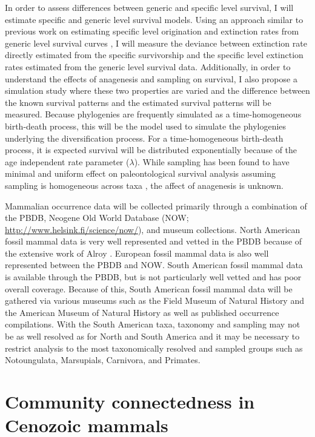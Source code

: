 \documentclass[12pt,letterpaper]{article}
\begin{document}
In order to assess differences between generic and specific level survival, I will estimate specific and generic level survival models. Using an approach similar to previous work on estimating specific level origination and extinction rates from generic level survival curves \citep{Foote1988}, I will measure the deviance between extinction rate directly estimated from the specific survivorship and the specific level extinction rates estimated from the generic level survival data. Additionally, in order to understand the effects of anagenesis and sampling on survival, I also propose a simulation study where these two properties are varied and the difference between the known survival patterns and the estimated survival patterns will be measured. Because phylogenies are frequently simulated as a time-homogeneous birth-death process, this will be the model used to simulate the phylogenies underlying the diversification process. For a time-homogeneous birth-death process, it is expected survival will be distributed exponentially because of the age independent rate parameter (\(\lambda\)). While sampling has been found to have minimal and uniform effect on paleontological survival analysis assuming sampling is homogeneous across taxa \citep{Sepkoski1975}, the affect of anagenesis is unknown. 

Mammalian occurrence data will be collected primarily through a combination of the PBDB, Neogene Old World Database (NOW; \url{http://www.helsink.fi/science/now/}), and museum collections. North American fossil mammal data is very well represented and vetted in the PBDB because of the extensive work of Alroy \citep{Alroy1996a,Alroy1998,Alroy2000g}. European fossil mammal data is also well represented between the PBDB and NOW. South American fossil mammal data is available through the PBDB, but is not particularly well vetted and has poor overall coverage. Because of this, South American fossil mammal data will be gathered via various museums such as the Field Museum of Natural History and the American Museum of Natural History as well as published occurrence compilations. With the South American taxa, taxonomy and sampling may not be as well resolved as for North and South America and it may be necessary to restrict analysis to the most taxonomically resolved and sampled groups such as Notoungulata, Marsupials, Carnivora, and Primates.


\section{Community connectedness in Cenozoic mammals}
\end{document}
